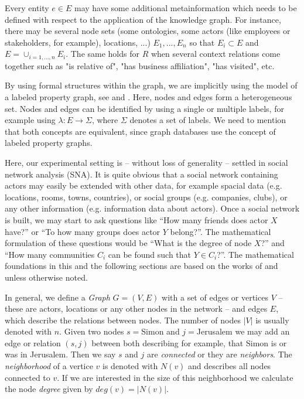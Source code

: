 Every entity $e\in E$ may have some additional metainformation which needs to be defined with respect to the application of the knowledge graph. For instance, there may be several node sets (some ontologies, some actors (like employees or stakeholders, for example), locations, ...) $E_{1},...,E_{n}$ so that $E_{i}\subset {E}$ and ${E} = \cup_{i=1,...,n} E_{i}$. The same holds for ${R}$ when several context relations come together such as "is relative of", "has business affiliation", "has visited", etc. 

By using formal structures within the graph, we are implicitly using the model of a labeled property graph, see \cite{rodriguez2012graph} and \cite{rodriguez2010constructions}. Here, nodes and edges form a heterogeneous set. Nodes and edges can be identified by using a single or multiple labels, for example using $\lambda:E\rightarrow \Sigma$, where $\Sigma$ denotes a set of labels. We need to mention that both concepts are equivalent, since graph databases use the concept of labeled property graphs.

Here, our experimental setting is -- without loss of generality -- settled in social network analysis (SNA). It is quite obvious that a social network containing actors may easily be extended with other data, for example spacial data (e.g. locations, rooms, towns, countries), or social groups (e.g. companies, clubs), or any other information (e.g. information data about actors). 
Once a social network is built, we may start to ask questions like ``How many friends does actor $X$ have?'' or ``To how many groups does actor $Y$ belong?''. The mathematical formulation of these questions would be ``What is the degree of node $X$?'' and ``How many communities $C_i$ can be found such that $Y\in C_i$?''.  The mathematical foundations in this and the following sections are based on  the works of \cite{diestel2012graphentheorie} and  \cite{matouvsek2007diskrete} unless otherwise noted.

In general, we define a \emph{Graph} $G=(V,E)$ with a set of edges or vertices $V$ -- these are actors, locations or any other nodes in the network -- and edges $E$, which describe the relations between nodes. The number of nodes $|V|$ is usually denoted with $n$. Given two nodes $s=$Simon and $j=$Jerusalem we may add an edge or relation $(s,j)$ between both describing for example, that Simon is or was in Jerusalem. Then we say $s$ and $j$ are \emph{connected} or they are \emph{neighbors}. The \emph{neighborhood} of a vertice $v$ is denoted with $N(v)$ and describes all nodes connected to $v$. If we are interested in the size of this neighborhood we calculate the node \emph{degree} given by $deg(v)=|N(v)|$. 

